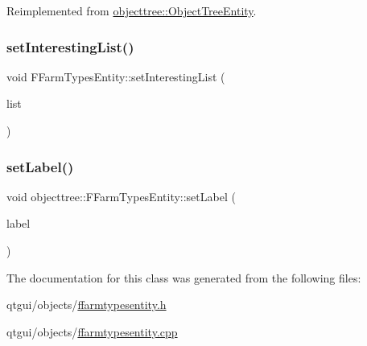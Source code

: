 Reimplemented from \mbox{\hyperlink{classobjecttree_1_1_object_tree_entity_ab6742194e637093cb1571998bee88ff5}{objecttree\+::\+Object\+Tree\+Entity}}.

\mbox{\label{classobjecttree_1_1_f_farm_types_entity_a5c1b06052657342726e3767f3b51aab8}} 
\subsubsection{\texorpdfstring{setInterestingList()}{setInterestingList()}}
{\footnotesize\ttfamily void F\+Farm\+Types\+Entity\+::set\+Interesting\+List (\begin{DoxyParamCaption}\item[{std\+::shared\+\_\+ptr$<$ \mbox{\hyperlink{class_interesting_list_with_special_values}{Interesting\+List\+With\+Special\+Values}}$<$ int $>$$>$}]{list }\end{DoxyParamCaption})}

\mbox{\label{classobjecttree_1_1_f_farm_types_entity_a0654c21dbf8c366fecc24e11c308a8a5}} 
\subsubsection{\texorpdfstring{setLabel()}{setLabel()}}
{\footnotesize\ttfamily void objecttree\+::\+F\+Farm\+Types\+Entity\+::set\+Label (\begin{DoxyParamCaption}\item[{Q\+String}]{label }\end{DoxyParamCaption})\hspace{0.3cm}{\ttfamily [inline]}}



The documentation for this class was generated from the following files\+:\begin{DoxyCompactItemize}
\item 
qtgui/objects/\mbox{\hyperlink{ffarmtypesentity_8h}{ffarmtypesentity.\+h}}\item 
qtgui/objects/\mbox{\hyperlink{ffarmtypesentity_8cpp}{ffarmtypesentity.\+cpp}}\end{DoxyCompactItemize}
